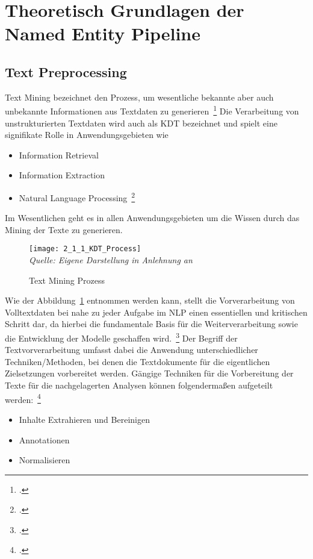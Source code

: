 \newpage
\section{Theoretisch Grundlagen der Named Entity Pipeline} \label{infos}

\subsection{Text Preprocessing} \label{TextPreprocessing}
Text Mining bezeichnet den Prozess, um wesentliche bekannte aber auch unbekannte Informationen aus Textdaten zu
generieren~\footcite[\vglf][]{mohan.2015}
Die Verarbeitung von unstrukturierten Textdaten wird auch als \ac{KDT}
bezeichnet und spielt eine signifikate Rolle in Anwendungsgebieten wie

\begin{itemize}
    \item Information Retrieval
    \item Information Extraction
    \item Natural Language Processing~\footcite[\vglf][ f.]{mohan.2015}
\end{itemize}
Im Wesentlichen geht es in allen \og Anwendungsgebieten um die Wissen durch das Mining der Texte zu generieren.

\begin{figure}[H]
    \caption{Text Mining Prozess}\label{fig:2_1_1_KDT_Process}
    \texttt{[image: 2\_1\_1\_KDT\_Process]}
    \\
    \textit{Quelle: Eigene Darstellung in Anlehnung an}~\cite[]{mohan.2015}
\end{figure}

Wie der Abbildung~\ref{fig:2_1_1_KDT_Process} entnommen werden kann, stellt die Vorverarbeitung von Volltextdaten bei nahe
zu jeder Aufgabe im \ac{NLP} einen essentiellen und kritischen Schritt dar,
da hierbei die fundamentale Basis für die Weiterverarbeitung
sowie die Entwicklung der Modelle geschaffen wird.~\footcite[\vglf][]{gurusamy.2014}
Der Begriff der Textvorverarbeitung umfasst dabei die Anwendung unterschiedlicher Techniken/Methoden, bei
denen die Textdokumente für die eigentlichen Zielsetzungen vorbereitet werden.
Gängige Techniken für die Vorbereitung der Texte für die nachgelagerten Analysen können folgendermaßen aufgeteilt
werden:~\footcite[\vglf][]{pahwa.2018}

\begin{itemize}
    \item Inhalte Extrahieren und Bereinigen
    \item Annotationen
    \item Normalisieren
\end{itemize}

